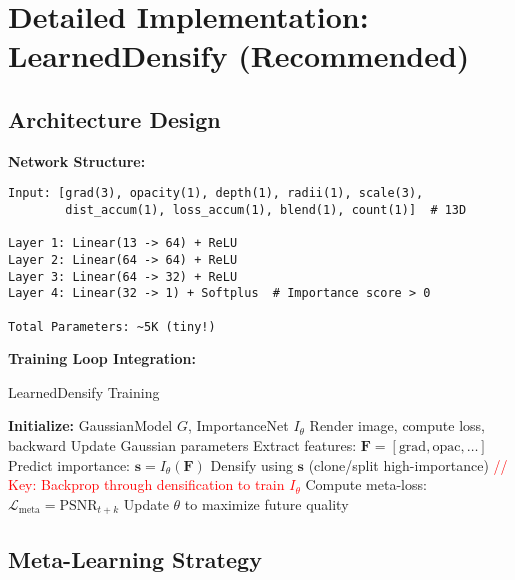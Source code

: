 \documentclass[11pt,letterpaper]{article}
\begin{document}
\section{Detailed Implementation: LearnedDensify (Recommended)}

\subsection{Architecture Design}

\textbf{Network Structure:}

\begin{verbatim}
Input: [grad(3), opacity(1), depth(1), radii(1), scale(3),
        dist_accum(1), loss_accum(1), blend(1), count(1)]  # 13D

Layer 1: Linear(13 -> 64) + ReLU
Layer 2: Linear(64 -> 64) + ReLU
Layer 3: Linear(64 -> 32) + ReLU
Layer 4: Linear(32 -> 1) + Softplus  # Importance score > 0

Total Parameters: ~5K (tiny!)
\end{verbatim}

\textbf{Training Loop Integration:}

\begin{algorithm}
\caption{LearnedDensify Training}
\begin{algorithmic}
\STATE \textbf{Initialize:} GaussianModel $G$, ImportanceNet $I_\theta$
    \STATE Render image, compute loss, backward
    \STATE Update Gaussian parameters
        \STATE Extract features: $\mathbf{F} = [\text{grad}, \text{opac}, \ldots]$
        \STATE Predict importance: $\mathbf{s} = I_\theta(\mathbf{F})$
        \STATE Densify using $\mathbf{s}$ (clone/split high-importance)
        \STATE \textcolor{red}{// Key: Backprop through densification to train $I_\theta$}
        \STATE Compute meta-loss: $\mathcal{L}_{\text{meta}} = \text{PSNR}_{t+k}$
        \STATE Update $\theta$ to maximize future quality
    \ENDIF
\ENDFOR
\end{algorithmic}
\end{algorithm}

\subsection{Meta-Learning Strategy}
\end{document}
